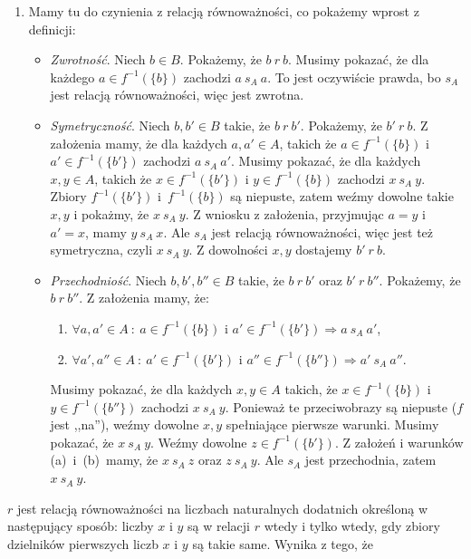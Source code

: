 \begin{solutions}
\begin{enumerate}[\bf A.]
        \item Mamy tu do czynienia z relacją równoważności, co pokażemy wprost z definicji:
        \begin{itemize}
            \item \textit{Zwrotność}. Niech $b \in B$. Pokażemy, że $b \ r \ b$. Musimy pokazać, że dla każdego $a \in f^{-1}(\{b\})$ zachodzi $a \ s_A \ a$. To jest oczywiście prawda, bo $s_A$ jest relacją równoważności, więc jest zwrotna.
            
            \item \textit{Symetryczność}. Niech $b, b' \in B$ takie, że $b \ r \ b'$. Pokażemy, że $b' \ r \ b$. Z założenia mamy, że dla każdych $a, a' \in A$, takich że $a\in f^{-1}(\{b\})$ i $a'\in f^{-1}(\{b'\})$ zachodzi $a \ s_A \ a'$. Musimy pokazać, że dla każdych $x, y \in A$, takich że $x\in f^{-1}(\{b'\})$ i $y\in f^{-1}(\{b\})$ zachodzi $x \ s_A \ y$. Zbiory $f^{-1}(\{b'\})$ i~$f^{-1}(\{b\})$ są niepuste, zatem weźmy dowolne takie $x, y$ i pokażmy, że $x \ s_A \ y$. Z wniosku z założenia, przyjmując $a = y$ i $a' = x$, mamy $y \ s_A \ x$. Ale $s_A$ jest relacją równoważności, więc jest też symetryczna, czyli $x \ s_A \ y$. Z dowolności $x, y$ dostajemy $b' \ r \ b$.
            
            \item \textit{Przechodniość}. Niech $b, b', b'' \in B$ takie, że $b \ r \ b'$ oraz $b' \ r \ b''$. Pokażemy, że $b \ r \ b''$. Z założenia mamy, że:
            \begin{enumerate}
                \item $\forall a, a' \in A \ : \ a\in f^{-1}(\{b\})$ i $a'\in f^{-1}(\{b'\}) \Rightarrow a \ s_A \ a'$,
                \item $\forall a', a'' \in A \ : \ a'\in f^{-1}(\{b'\})$ i $a''\in f^{-1}(\{b''\}) \Rightarrow a' \ s_A \ a''$.
            \end{enumerate}
            Musimy pokazać, że dla każdych $x, y \in A$ takich, że $x\in f^{-1}(\{b\})$ i $y\in f^{-1}(\{b''\})$ zachodzi $x \ s_A \ y$. Ponieważ te przeciwobrazy są niepuste ($f$ jest ,,na''), weźmy dowolne $x, y$ spełniające pierwsze warunki. Musimy pokazać, że $x \ s_A \ y$. Weźmy dowolne $z \in f^{-1}(\{b'\})$. Z założeń i warunków (a)~i~(b)~mamy, że $x \ s_A \ z$ oraz $z \ s_A \ y$. Ale $s_A$ jest przechodnia, zatem $x \ s_A \ y$.
        \end{itemize}
    \end{enumerate}

    \sol $r$ jest relacją równoważności na liczbach naturalnych dodatnich określoną w następujący sposób: liczby $x$ i $y$ są w relacji $r$ wtedy i tylko wtedy, gdy zbiory dzielników pierwszych liczb $x$ i $y$ są takie same. Wynika z tego, że


\end{solutions}
